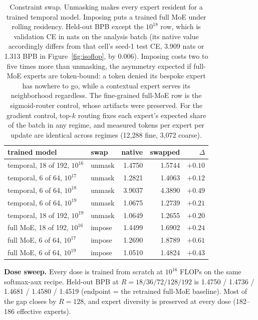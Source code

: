 \documentclass{article}
\begin{document}
\begin{table}[h]
  \centering\small
  \caption{Constraint swap. Unmasking makes every expert resident for a trained temporal model.
  Imposing puts a trained full MoE under rolling residency. Held-out BPB except the $10^{18}$
  row, which is validation CE in nats on the analysis batch (its native value accordingly differs
  from that cell's seed-1 test CE, 3.909 nats or 1.313 BPB in Figure~\ref{fig:isoflop}, by 0.006). Imposing costs two to five times more
  than unmasking, the asymmetry expected if full-MoE experts are token-bound: a token denied its
  bespoke expert has nowhere to go, while a contextual expert serves its neighborhood
  regardless. The fine-grained full-MoE row is the sigmoid-router control, whose artifacts were
  preserved. For the gradient control, top-$k$ routing fixes each expert's expected share of the
  batch in any regime, and measured tokens per expert per update are identical across regimes
  (12{,}288 fine, 3{,}072 coarse).}
  \label{tab:swap}
  \vspace{4pt}
  \begin{tabular}{@{}llrrr@{}}
    \toprule
    trained model & swap & native & swapped & $\Delta$ \\
    \midrule
    temporal, 18 of 192, $10^{16}$ & unmask & 1.4750 & 1.5744 & $+0.10$ \\
    temporal, 6 of 64, $10^{17}$   & unmask & 1.2821 & 1.4063 & $+0.12$ \\
    temporal, 6 of 64, $10^{18}$   & unmask & 3.9037 & 4.3890 & $+0.49$ \\
    temporal, 6 of 64, $10^{19}$   & unmask & 1.0675 & 1.2739 & $+0.21$ \\
    temporal, 18 of 192, $10^{19}$ & unmask & 1.0649 & 1.2655 & $+0.20$ \\
    full MoE, 18 of 192, $10^{16}$ & impose & 1.4499 & 1.6902 & $+0.24$ \\
    full MoE, 6 of 64, $10^{17}$   & impose & 1.2690 & 1.8789 & $+0.61$ \\
    full MoE, 6 of 64, $10^{19}$   & impose & 1.0510 & 1.4824 & $+0.43$ \\
    \bottomrule
  \end{tabular}
\end{table}

\textbf{Dose sweep.} Every dose is trained from scratch at $10^{16}$ FLOPs on the same
softmax-aux recipe. Held-out BPB at $R = 18/36/72/128/192$ is 1.4750 / 1.4736 / 1.4681 / 1.4580 /
1.4519 (endpoint = the retrained full-MoE baseline). Most of the gap closes by $R = 128$, and
expert diversity is preserved at every dose (182--186 effective experts).
\end{document}
